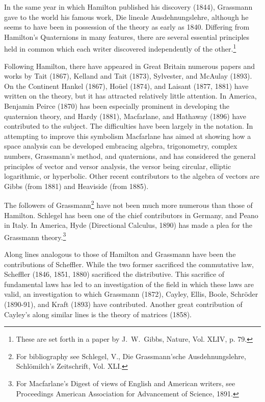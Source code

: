 \documentclass[oneside]{book}
\begin{document}
{In the same year in which Hamilton published his discovery (1844),
Grassmann gave to the world his famous work, Die lineale
Ausdehnungslehre, although he seems to have been in possession of
the theory as early as 1840. Differing from Hamilton's Quaternions
in many features, there are several essential principles held in
common which each writer discovered independently of the
other.\footnote{These are set forth in a paper by J.~W.~Gibbs,
Nature, Vol. XLIV, p. 79.}

Following Hamilton, there have appeared in Great Britain numerous
papers and works by Tait (1867), Kelland and Tait (1873), Sylvester,
and McAulay (1893). On the Continent Hankel (1867), Ho\"uel (1874),
and Laisant (1877, 1881) have written on the theory, but it has
attracted relatively little attention. In America, Benjamin Peirce
(1870) has been especially prominent in developing the quaternion
theory, and Hardy (1881), Macfarlane, and Hathaway (1896) have
contributed to the subject. The difficulties have been largely in
the notation. In attempting to improve this symbolism Macfarlane has
aimed at showing how a space analysis can be developed embracing
algebra, trigonometry, complex numbers, Grassmann's method, and
quaternions, and has considered the general principles of vector and
versor analysis, the versor being circular, elliptic logarithmic, or
hyperbolic. Other recent contributors to the algebra of vectors are
Gibbs (from 1881) and Heaviside (from 1885).

The followers of Grassmann\footnote{For bibliography see Schlegel,
V., Die Grassmann'sche Ausdehnungslehre, Schl\"omilch's Zeitschrift,
Vol. XLI.} have not been much more numerous than those of
Hamilton. Schlegel has been one of the chief contributors in
Germany, and Peano in Italy. In America, Hyde (Directional Calculus,
1890) has made a plea for the Grassmann theory.\footnote{For
Macfarlane's Digest of views of English and American writers, see
Proceedings American Association for Advancement of Science, 1891.}

Along lines analogous to those of Hamilton and Grassmann have been
the contributions of Scheffler. While the two former sacrificed the
commutative law, Scheffler (1846, 1851, 1880) sacrificed the
distributive. This sacrifice of fundamental laws has led to an
investigation of the field in which these laws are valid, an
investigation to which Grassmann (1872), Cayley, Ellis, Boole,
Schr\"oder (1890-91), and Kraft (1893) have contributed. Another
great contribution of Cayley's along similar lines is the theory of
matrices (1858).

}
\end{document}
